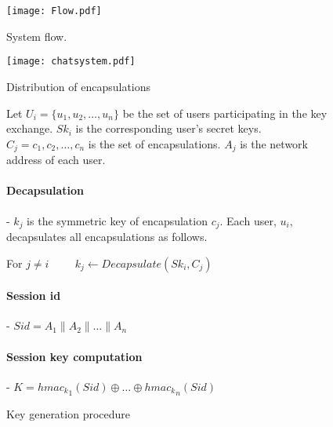 \begin{figure}[H]
\centering
\texttt{[image: Flow.pdf]}
\caption{System flow.}
\label{fig:flow}
\end{figure}


\begin{figure}[H]
\centering
\texttt{[image: chatsystem.pdf]}
\caption{Distribution of encapsulations}
\label{fig:encapdistr}
\end{figure}

\begin{figure}[H]
\begin{mdframed}
Let $U_i = \{u_1,u_2,\dots,u_n\}$ be the set of users participating in the key exchange. $Sk_i$ is the corresponding user's secret keys. $C_j = c_1,c_2,\dots,c_n$ is the set of encapsulations. $A_j$ is the network address of each user.
\paragraph{Decapsulation} - $k_j$ is the symmetric key of encapsulation $c_j$. Each user, $u_i$, decapsulates all encapsulations as follows.
\centerline{For $j\neq i \hspace{1cm}   k_j \leftarrow Decapsulate(Sk_i, C_j)$}

\paragraph{Session id} - $Sid = A_1 \parallel A_2 \parallel \dots \parallel A_n$
\paragraph{Session key computation} - $K = {hmac_k}_1(Sid) \oplus \dots \oplus {hmac_k}_n(Sid)$

\caption{Key generation procedure}\label{fig:keygen}
\end{mdframed}
\end{figure}




